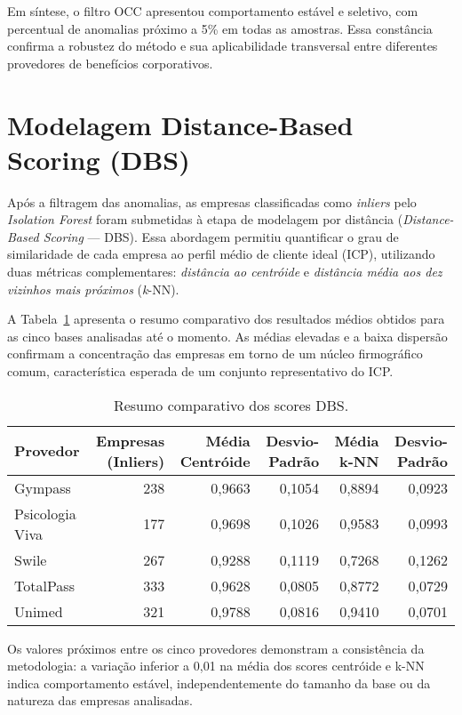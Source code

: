 Em síntese, o filtro OCC apresentou comportamento estável e seletivo, com percentual de anomalias próximo a 5\% em todas as amostras. Essa constância confirma a robustez do método e sua aplicabilidade transversal entre diferentes provedores de benefícios corporativos.


\section{Modelagem Distance-Based Scoring (DBS)}

Após a filtragem das anomalias, as empresas classificadas como \textit{inliers} pelo \textit{Isolation Forest} foram submetidas à etapa de modelagem por distância (\textit{Distance-Based Scoring} — DBS). Essa abordagem permitiu quantificar o grau de similaridade de cada empresa ao perfil médio de cliente ideal (ICP), utilizando duas métricas complementares: \textit{distância ao centróide} e \textit{distância média aos dez vizinhos mais próximos} (\textit{k}-NN).

A Tabela~\ref{tab:7_5_dbs_all} apresenta o resumo comparativo dos resultados médios obtidos para as cinco bases analisadas até o momento. As médias elevadas e a baixa dispersão confirmam a concentração das empresas em torno de um núcleo firmográfico comum, característica esperada de um conjunto representativo do ICP.

\begin{table}[H]
\centering
\caption{Resumo comparativo dos scores DBS.}
\label{tab:7_5_dbs_all}
\begin{tabular}{lrrrrr}
\toprule
\textbf{Provedor} & \textbf{Empresas (Inliers)} & \textbf{Média Centróide} & \textbf{Desvio-Padrão} & \textbf{Média k-NN} & \textbf{Desvio-Padrão} \\
\midrule
Gympass & 238 & 0,9663 & 0,1054 & 0,8894 & 0,0923 \\
Psicologia Viva & 177 & 0,9698 & 0,1026 & 0,9583 & 0,0993 \\
Swile & 267 & 0,9288 & 0,1119 & 0,7268 & 0,1262 \\
TotalPass & 333 & 0,9628 & 0,0805 & 0,8772 & 0,0729 \\
Unimed & 321 & 0,9788 & 0,0816 & 0,9410 & 0,0701 \\
\bottomrule
\end{tabular}
\end{table}

Os valores próximos entre os cinco provedores demonstram a consistência da metodologia: a variação inferior a 0,01 na média dos scores centróide e k-NN indica comportamento estável, independentemente do tamanho da base ou da natureza das empresas analisadas. 

